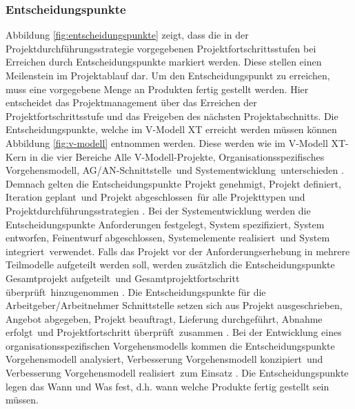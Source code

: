  \subsubsection{Entscheidungspunkte}
Abbildung \ref{fig:entscheidungspunkte} zeigt, dass die in der Projektdurchführungsstrategie vorgegebenen Projektfortschrittsstufen bei Erreichen durch Entscheidungspunkte markiert werden. Diese stellen einen Meilenstein im Projektablauf dar. Um den Entscheidungspunkt zu erreichen, muss eine vorgegebene Menge an Produkten fertig gestellt werden. Hier entscheidet das Projektmanagement über das Erreichen der Projektfortschrittsstufe und das Freigeben des nächsten Projektabschnitts. Die Entscheidungspunkte, welche im V-Modell XT erreicht werden müssen können Abbildung \ref{fig:v-modell} entnommen werden. Diese werden wie im V-Modell XT-Kern in die vier Bereiche \grqq Alle V-Modell-Projekte\grqq, \grqq Organisationsspezifisches Vorgehensmodell\grqq, \grqq AG/AN-Schnittstelle\grqq \ und \grqq Systementwicklung\grqq \ unterschieden \cite{2004vmodell}. \newline
Demnach gelten die Entscheidungspunkte \grqq Projekt genehmigt\grqq, \grqq Projekt definiert, \grqq Iteration geplant\grqq \ und \grqq Projekt abgeschlossen\grqq \ für alle Projekttypen und Projektdurchführungsstrategien \cite{2004vmodell}. \newline
Bei der Systementwicklung werden die Entscheidungspunkte \grqq Anforderungen festgelegt\grqq, \grqq System spezifiziert\grqq, \grqq System entworfen\grqq, \grqq Feinentwurf abgeschlossen\grqq, \grqq Systemelemente realisiert\grqq \ und \grqq System integriert\grqq \ verwendet. Falls das Projekt vor der Anforderungserhebung in mehrere Teilmodelle aufgeteilt werden soll, werden zusätzlich die Entscheidungspunkte \grqq Gesamtprojekt aufgeteilt\grqq \ und \grqq Gesamtprojektfortschritt überprüft\grqq \ hinzugenommen \cite{2004vmodell}. \newline
Die Entscheidungspunkte für die Arbeitgeber/Arbeitnehmer Schnittstelle setzen sich aus \grqq Projekt ausgeschrieben\grqq, \grqq Angebot abgegeben\grqq, \grqq Projekt beauftragt\grqq, \grqq Lieferung durchgeführt\grqq, \grqq Abnahme erfolgt\grqq \ und \grqq Projektfortschritt überprüft\grqq \ zusammen \cite{2004vmodell}. \newline
 Bei der Entwicklung eines organisationsspezifischen Vorgehensmodells kommen die Entscheidungspunkte \grqq Vorgehensmodell analysiert\grqq, \grqq Verbesserung Vorgehensmodell konzipiert\grqq \ und \grqq Verbesserung Vorgehensmodell realisiert\grqq \ zum Einsatz \cite{2004vmodell}. \newline
 Die Entscheidungspunkte legen das \grqq Wann\grqq {} und \grqq Was\grqq {} fest, d.h. wann welche Produkte fertig gestellt sein müssen.

